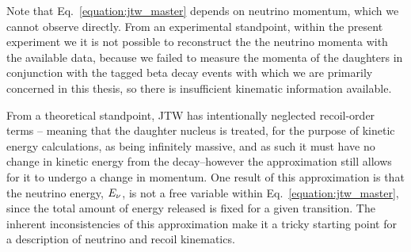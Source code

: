 

Note that Eq.~\ref{equation:jtw_master} depends on neutrino momentum, which we cannot observe directly.  
From an experimental standpoint, within the present experiment we it is not possible to reconstruct the the neutrino momenta with the available data, because we failed to measure the momenta of the daughters in conjunction with the tagged beta decay events with which we are primarily concerned in this thesis, so there is insufficient kinematic information available.   

From a theoretical standpoint, JTW has intentionally neglected recoil-order terms -- meaning that the daughter nucleus is treated, for the purpose of kinetic energy calculations, as being infinitely massive, and as such it must have no change in kinetic energy from the decay--however the approximation still allows for it to undergo a change in momentum.  One result of this approximation is that the neutrino energy, $E_{\nu}$, is not a free variable within Eq.~\ref{equation:jtw_master}, since the total amount of energy released is fixed for a given transition.  The inherent inconsistencies of this approximation make it a tricky starting point for a description of neutrino and recoil kinematics.


